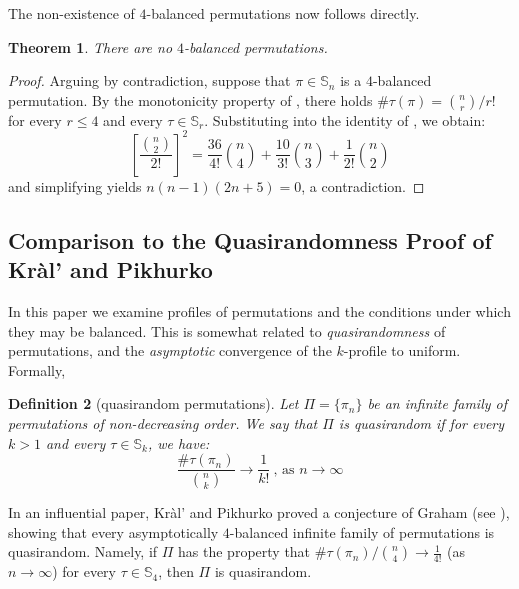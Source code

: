 \documentclass{article}
\newtheorem{theorem}{Theorem}[section]
\newtheorem{definition}[theorem]{Definition}
\newcommand{\Sn}{\mathbb{S}_n}
\newcommand{\pc}[2]{{\# \mathtt{ #1 } \left( #2 \right)}}
\theoremstyle{remark}
\theoremstyle{plain}
\begin{document}
The non-existence of $4$-balanced permutations now follows directly.

\begin{theorem}
    \label{thm:no_4balanced}
    There are no $4$-balanced permutations.
\end{theorem}
\begin{proof}
    Arguing by contradiction, suppose that $\pi \in \Sn$ is a $4$-balanced permutation. By the monotonicity property of , there holds $\pc{\tau}{\pi} = \binom{n}{r}/r!$ for every $r \le 4$ and every $\tau \in \mathbb{S}_r$. Substituting into the identity of , we obtain:
    \begin{equation}
        \label{eq:4bal_contradiction}
        \left[\frac{\binom{n}{2}}{2!}\right]^2 = \frac{36}{4!} \binom{n}{4} + \frac{10}{3!} \binom{n}{3} + \frac{1}{2!} \binom{n}{2} 
    \end{equation}
    and simplifying yields $n(n-1)(2n + 5) = 0$, a contradiction.
\end{proof}

\subsection{Comparison to the Quasirandomness Proof of Kr\`al' and Pikhurko}
\label{subsect:comparison_kp}

In this paper we examine profiles of permutations and the conditions under which they may be balanced. This is somewhat related to \emph{quasirandomness} of permutations, and the {\em asymptotic} convergence of the $k$-profile to uniform. Formally,

\begin{definition}[quasirandom permutations] 
    \label{defn:quasirandom}
    Let $\Pi = \{ \pi_n \}$ be an infinite family of permutations of non-decreasing order. We say that $\Pi$ is quasirandom if for every $k > 1$ and every $\tau \in \mathbb{S}_k$, we have:
    \[
        \frac{\pc{\tau}{\pi_n}}{\binom{n}{k}} \to \frac{1}{k!} \ \text{, as } n \to \infty 
    \]
\end{definition}

In an influential paper, \cite{kral2013quasirandom} Kr\`al' and Pikhurko proved a conjecture of Graham (see \cite{cooper2004quasirandom}), showing that every asymptotically $4$-balanced infinite family of permutations is quasirandom. Namely, if $\Pi$ has the property that $\pc{\tau}{\pi_n}/\binom{n}{4} \to \tfrac{1}{4!}$ (as $n \to \infty$) for every $\tau \in \mathbb{S}_4$, then $\Pi$ is quasirandom. 
\end{document}
